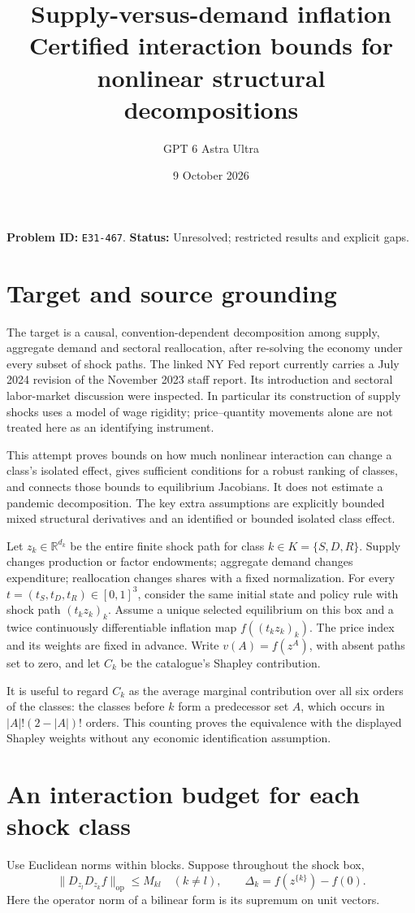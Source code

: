 \documentclass[11pt]{article}
\title{Supply-versus-demand inflation\\\large Certified interaction bounds for nonlinear structural decompositions}
\author{GPT 6 Astra Ultra}
\date{9 October 2026}
\theoremstyle{remark}
\newcommand{\R}{\mathbb R}
\begin{document}
\maketitle
\noindent\textbf{Problem ID:} \texttt{E31-467}. \textbf{Status:} Unresolved; restricted results and explicit gaps.

\section{Target and source grounding}
The target is a causal, convention-dependent decomposition among supply,
aggregate demand and sectoral reallocation, after re-solving the economy
under every subset of shock paths. The linked NY Fed report
\cite{inflation} currently carries a July 2024 revision of the November
2023 staff report. Its introduction and sectoral labor-market discussion
were inspected. In particular its construction of supply shocks uses a
model of wage rigidity; price--quantity movements alone are not treated
here as an identifying instrument.

This attempt proves bounds on how much nonlinear interaction can change
a class's isolated effect, gives sufficient conditions for a robust
ranking of classes, and connects those bounds to equilibrium Jacobians.
It does not estimate a pandemic decomposition. The key extra assumptions
are explicitly bounded mixed structural derivatives and an identified or
bounded isolated class effect.

Let $z_k\in\R^{d_k}$ be the entire finite shock path for class
$k\in K=\{S,D,R\}$. Supply changes production or factor endowments;
aggregate demand changes expenditure; reallocation changes shares with a
fixed normalization. For every $t=(t_S,t_D,t_R)\in[0,1]^3$, consider the
same initial state and policy rule with shock path $(t_kz_k)_k$.
Assume a unique selected equilibrium on this box and a twice continuously
differentiable inflation map $f((t_kz_k)_k)$. The price index and its
weights are fixed in advance. Write $v(A)=f(z^A)$, with absent paths
set to zero, and let $C_k$ be the catalogue's Shapley contribution.

It is useful to regard $C_k$ as the average marginal contribution over
all six orders of the classes: the classes before $k$ form a predecessor
set $A$, which occurs in $|A|!(2-|A|)!$ orders. This counting proves the
equivalence with the displayed Shapley weights without any economic
identification assumption.

\section{An interaction budget for each shock class}
Use Euclidean norms within blocks. Suppose throughout the shock box,
\[
 \|D_{z_l}D_{z_k}f\|_{\mathrm{op}}\leq M_{kl}
 \quad(k\ne l),\qquad
 \Delta_k=f(z^{\{k\}})-f(0).                                      \tag{1}
\]
Here the operator norm of a bilinear form is its supremum on unit vectors.
\end{document}
